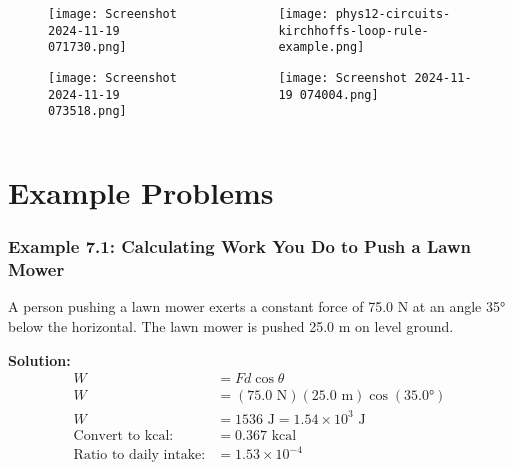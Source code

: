 \documentclass{beamer}
\begin{document}
\begin{frame}
\begin{columns}[T]
    \begin{column}{0.5\textwidth}
        \begin{figure}
            \centering
            \texttt{[image: Screenshot 2024-11-19 071730.png]}
        \end{figure}
        \begin{figure}
            \centering
            \texttt{[image: Screenshot 2024-11-19 073518.png]}
        \end{figure}
    \end{column}
    
    \begin{column}{0.5\textwidth}
        \begin{figure}
            \centering
            \texttt{[image: phys12-circuits-kirchhoffs-loop-rule-example.png]}
        \end{figure}
        \begin{figure}
            \centering
            \texttt{[image: Screenshot 2024-11-19 074004.png]}
        \end{figure}
    \end{column}
\end{columns}
\end{frame}

\section{Example Problems}

\begin{frame}
\frametitle{Example 7.1: Calculating Work You Do to Push a Lawn Mower}
A person pushing a lawn mower exerts a constant force of 75.0 N at an angle 35° below the horizontal. The lawn mower is pushed 25.0 m on level ground.
\vspace{0.5cm}
\end{frame}

\begin{frame}
\textbf{Solution:}
\begin{align*}
W &= Fd\cos\theta \\
W &= (75.0\text{ N})(25.0\text{ m})\cos(35.0°) \\
W &= 1536\text{ J} = 1.54 \times 10^3\text{ J} \\
\text{Convert to kcal:} &= 0.367\text{ kcal} \\
\text{Ratio to daily intake:} &= 1.53 \times 10^{-4}
\end{align*}
\end{frame}
\end{document}
